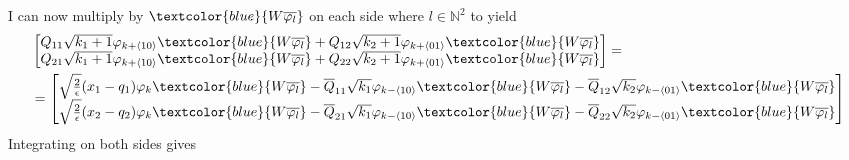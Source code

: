 I can now multiply by $\textcolor{blue}{W\overline{\varphi_l}}$ on each side where $l \in \mathbb{N}^2$
to yield
\begin{align}
  \begin{split}
  &\begin{bmatrix}
  Q_{11} \sqrt{k_{1} + 1} \varphi_{k + \langle 10 \rangle}
   \textcolor{blue}{W\overline{\varphi_l}}
   +
   Q_{12} \sqrt{k_{2} + 1} \varphi_{k + \langle 01 \rangle}
   \textcolor{blue}{W\overline{\varphi_l}}
   \\
  Q_{21} \sqrt{k_{1} + 1} \varphi_{k + \langle 10 \rangle}
  \textcolor{blue}{W\overline{\varphi_l}}
  +
   Q_{22} \sqrt{k_{2} + 1} \varphi_{k + \langle 01 \rangle}
 \textcolor{blue}{W\overline{\varphi_l}}
 \end{bmatrix}
  =
  \\
  &
  =\begin{bmatrix}
    \sqrt{\frac{2}{\epsilon}}(x_1 - q_1)\varphi_k
    \textcolor{blue}{W\overline{\varphi_l}}
    -
    \overline{Q}_{11} \sqrt{k_{1}} \varphi_{k - \langle 10 \rangle}
    \textcolor{blue}{W\overline{\varphi_l}}
   -
     \overline{Q}_{12} \sqrt{k_{2}} \varphi_{k - \langle 01 \rangle}
    \textcolor{blue}{W\overline{\varphi_l}}
  \\
    \sqrt{\frac{2}{\epsilon}}(x_2 - q_2)\varphi_k
    \textcolor{blue}{W\overline{\varphi_l}}
    -
    \overline{Q}_{21} \sqrt{k_{1}} \varphi_{k - \langle 10 \rangle}
   \textcolor{blue}{W\overline{\varphi_l}}
   -
     \overline{Q}_{22} \sqrt{k_{2}} \varphi_{k - \langle 01 \rangle}
  \textcolor{blue}{W\overline{\varphi_l}}
  \end{bmatrix}
  \end{split}
\end{align}
Integrating on both sides gives
